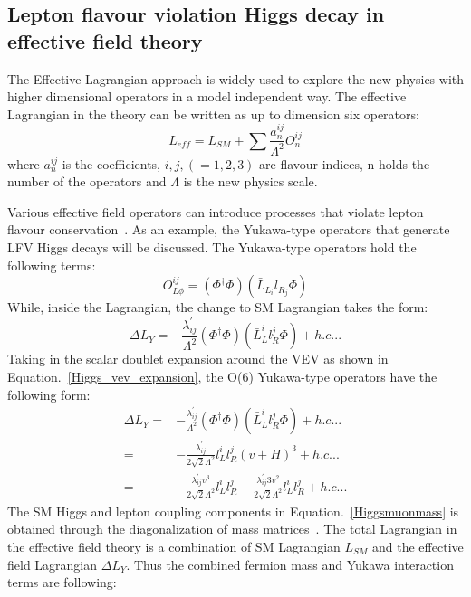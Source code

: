 \subsection{Lepton flavour violation Higgs decay in effective field theory}\label{effective_field}
The Effective Lagrangian approach is widely used to explore the new physics with higher dimensional operators in a model independent way. The effective Lagrangian in the theory can be written as up to dimension six operators: 
\begin{equation}
L_{eff}=L_{SM}+\sum\frac{a^{ij}_{n}}{\Lambda^{2}}O^{ij}_{n}
\end{equation}
where $a^{ij}_{n}$ is the coefficients, $i,j,(=1,2,3)$ are flavour indices, n holds the number of the operators and $\Lambda$ is the new physics scale. 

Various effective field operators can introduce processes that violate lepton flavour conservation~\cite{PhysRevD.62.116005}. As an example, the Yukawa-type operators that generate LFV Higgs decays will be discussed. The Yukawa-type operators hold the following terms:
\begin{equation}
O^{ij}_{L\phi}=(\Phi^{\dagger}\Phi)(\bar{L}_{L_{i}}l_{R_{j}}\Phi)
\end{equation}
While, inside the Lagrangian, the change to SM Lagrangian takes the form:
\begin{equation}
\Delta L_{Y}=-\frac{\lambda^{'}_{ij}}{\Lambda^{2}}(\Phi^{\dagger}\Phi)(\bar{L}^{i}_{L}l^{j}_{R}\Phi)+h.c...
\end{equation}
Taking in the scalar doublet expansion around the VEV as shown in Equation.~\ref{Higgs_vev_expansion}, the O(6) Yukawa-type operators have the following form:
\begin{equation}
\begin{aligned}
\Delta L_{Y}=&-\frac{\lambda^{'}_{ij}}{\Lambda^{2}}(\Phi^{\dagger}\Phi)(\bar{L}^{i}_{L}l^{j}_{R}\Phi)+h.c...\\
         =&-\frac{\lambda^{'}_{ij}}{2\sqrt{2}\Lambda^{2}}l_{L}^{i}l_{R}^{j}(v+H)^{3}+h.c...\\
         =&-\frac{\lambda^{'}_{ij}v^{3}}{2\sqrt{2}\Lambda^{2}}l_{L}^{i}l_{R}^{j}-\frac{\lambda^{'}_{ij}3v^{2}}{2\sqrt{2}\Lambda^{2}}l_{L}^{i}l_{R}^{j}+h.c...
\end{aligned}
\end{equation}
The SM Higgs and lepton coupling components in Equation.~\ref{Higgsmuonmass} is obtained through the diagonalization of mass matrices~\cite{Harnik:2012pb}. The total Lagrangian in the effective field theory is a combination of SM Lagrangian $L_{SM}$ and the effective field Lagrangian $\Delta L_{Y}$. Thus the combined fermion mass and Yukawa interaction terms are following:
